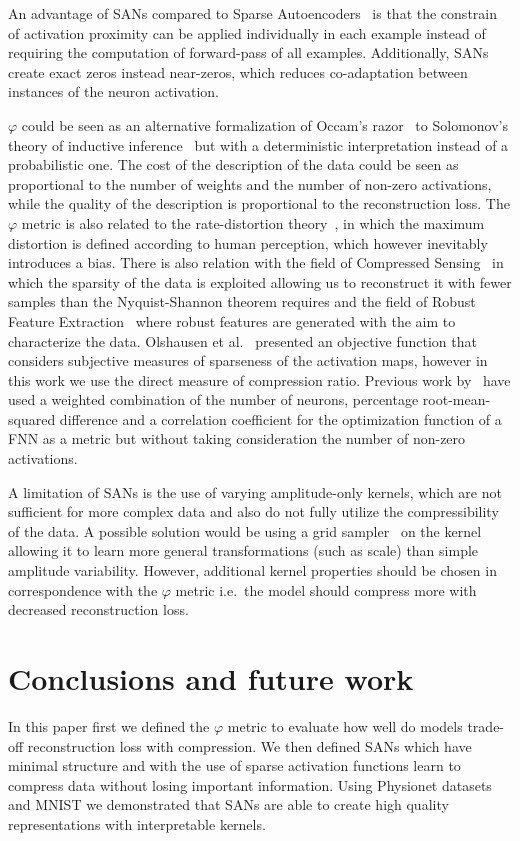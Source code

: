 \documentclass[journal]{IEEEtran}
\begin{document}
An advantage of SANs compared to Sparse Autoencoders~\cite{ng2011sparse} is that the constrain of activation proximity can be applied individually in each example instead of requiring the computation of forward-pass of all examples.
Additionally, SANs create exact zeros instead near-zeros, which reduces co-adaptation between instances of the neuron activation.

$\varphi$ could be seen as an alternative formalization of Occam's razor~\cite{soklakov2002occam} to Solomonov's theory of inductive inference~\cite{solomonoff1964formal} but with a deterministic interpretation instead of a probabilistic one.
The cost of the description of the data could be seen as proportional to the number of weights and the number of non-zero activations, while the quality of the description is proportional to the reconstruction loss.
The $\varphi$ metric is also related to the rate-distortion theory~\cite{burger1971rate}, in which the maximum distortion is defined according to human perception, which however inevitably introduces a bias.
There is also relation with the field of Compressed Sensing~\cite{donoho2006compressed} in which the sparsity of the data is exploited allowing us to reconstruct it with fewer samples than the Nyquist-Shannon theorem requires and the field of Robust Feature Extraction~\cite{kim2013deep} where robust features are generated with the aim to characterize the data.
Olshausen et al.~\cite{olshausen1996emergence} presented an objective function that considers subjective measures of sparseness of the activation maps, however in this work we use the direct measure of compression ratio.
Previous work by~\cite{zhang2017ecg} have used a weighted combination of the number of neurons, percentage root-mean-squared difference and a correlation coefficient for the optimization function of a FNN as a metric but without taking consideration the number of non-zero activations.

A limitation of SANs is the use of varying amplitude-only kernels, which are not sufficient for more complex data and also do not fully utilize the compressibility of the data.
A possible solution would be using a grid sampler~\cite{jaderberg2015spatial} on the kernel allowing it to learn more general transformations (such as scale) than simple amplitude variability.
However, additional kernel properties should be chosen in correspondence with the $\varphi$ metric i.e.\ the model should compress more with decreased reconstruction loss.

\section{Conclusions and future work}
\label{sec:conclusions}
In this paper first we defined the $\varphi$ metric to evaluate how well do models trade-off reconstruction loss with compression.
We then defined SANs which have minimal structure and with the use of sparse activation functions learn to compress data without losing important information.
Using Physionet datasets and MNIST we demonstrated that SANs are able to create high quality representations with interpretable kernels.
\end{document}
